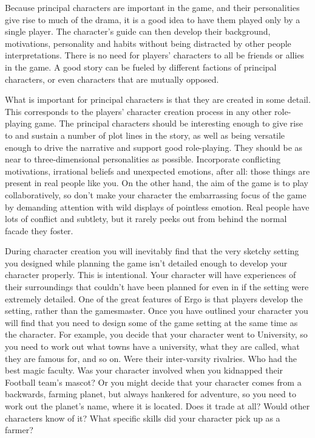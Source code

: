 \documentclass[twoside]{book}
\begin{document}
Because principal characters are important in the game, and their
personalities give rise to much of the drama, it is a good idea to
have them played only by a single player. The character's guide can
then develop their background, motivations, personality and habits
without being distracted by other people interpretations. There is no
need for players' characters to all be friends or allies in the
game. A good story can be fueled by different factions of principal
characters, or even characters that are mutually opposed.

What is important for principal characters is that they are created in
some detail. This corresponds to the players' character creation
process in any other role-playing game. The principal characters
should be interesting enough to give rise to and sustain a number of
plot lines in the story, as well as being versatile enough to drive
the narrative and support good role-playing. They should be as near to
three-dimensional personalities as possible. Incorporate conflicting
motivations, irrational beliefs and unexpected emotions, after all:
those things are present in real people like you. On the other hand,
the aim of the game is to play collaboratively, so don't make your
character the embarrassing focus of the game by demanding attention
with wild displays of pointless emotion. Real people have lots of
conflict and subtlety, but it rarely peeks out from behind the normal
facade they foster.

During character creation you will inevitably find that the very
sketchy setting you designed while planning the game isn't detailed
enough to develop your character properly. This is intentional. Your
character will have experiences of their surroundings that couldn't
have been planned for even in if the setting were extremely
detailed. One of the great features of Ergo is that players develop
the setting, rather than the gamesmaster. Once you have outlined your
character you will find that you need to design some of the game
setting at the same time as the character. For example, you decide
that your character went to University, so you need to work out what
towns have a university, what they are called, what they are famous
for, and so on. Were their inter-varsity rivalries. Who had the best
magic faculty. Was your character involved when you kidnapped their
Football team's mascot? Or you might decide that your character comes
from a backwards, farming planet, but always hankered for adventure,
so you need to work out the planet's name, where it is located. Does
it trade at all? Would other characters know of it? What specific
skills did your character pick up as a farmer?
\end{document}
